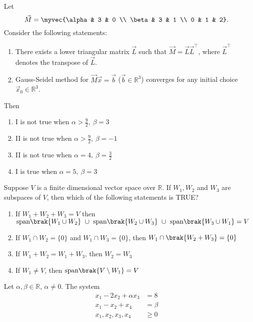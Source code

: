 \item Let 
\[
\vec{M} = \myvec{\alpha & 3 & 0 \\ \beta & 3 & 1 \\ 0 & 1 & 2}.
\]
Consider the following statements:  
	\begin{enumerate}[label=\Roman*:]
\item There exists a lower triangular matrix $\vec{L}$ such that $\vec{M} = \vec{L}\vec{L}^{\top}$, where $\vec{L}^{\top}$ denotes the transpose of $\vec{L}$.  
\item  Gauss-Seidel method for $\vec{M}\vec{x}=\vec{b}$ ($\vec{b} \in \mathbb{R}^3$) converges for any initial choice $\vec{x}_0 \in \mathbb{R}^3$.  
\end{enumerate}
Then
\hfill{}
\begin{multicols}{2}
\begin{enumerate}
\item I is not true when $\alpha > \tfrac{9}{2}, \ \beta = 3$
\item II is not true when $\alpha > \tfrac{9}{2}, \ \beta = -1$
\item II is not true when $\alpha = 4, \ \beta = \tfrac{3}{2}$
\item I is true when $\alpha = 5, \ \beta = 3$
\end{enumerate}
\end{multicols}
\item Suppose $V$ is a finite dimensional vector space over $\mathbb{R}$. If $W_1,W_2$ and $W_3$ are subspaces of $V$, then which of the following statements is TRUE?
\hfill{}
\begin{enumerate}
\item If $W_1+W_2+W_3=V$ then $\text{span}\brak{W_1\cup W_2}\ \cup\ \text{span}\brak{W_2\cup W_3}\ \cup\ \text{span}\brak{W_3\cup W_1}=V$
\item If $W_1\cap W_2=\{0\}$ and $W_1\cap W_3=\{0\}$, then $W_1\cap \brak{W_2+W_3}=\{0\}$
\item If $W_1+W_2=W_1+W_3$, then $W_2=W_3$
\item If $W_1\ne V$, then $\text{span}\brak{V\setminus W_1}=V$
\end{enumerate}
\item Let $\alpha,\beta \in \mathbb{R}$, $\alpha \ne 0$. The system
\begin{align*}
x_1-2x_2+\alpha x_3 &= 8\\
x_1-x_2+x_4 &= \beta\\
x_1,x_2,x_3,x_4 &\ge 0
\end{align*}
